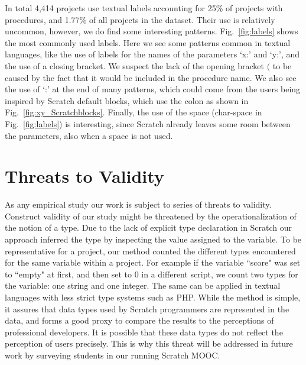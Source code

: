\documentclass[conference]{IEEEtran}
\begin{document}
In total 4,414 projects use textual labels accounting for 25\% of projects with procedures, and 1.77\% of all projects in the dataset. Their use is relatively uncommon, however, we do find some interesting patterns. 
Fig.~\ref{fig:labels} shows the most commonly used labels. Here we see some patterns common in textual languages, like the use of labels for the names of the parameters `x:' and `y:', and the use of a closing bracket. We suspect the lack of the opening bracket $($ to be caused by the fact that it would be included in the procedure name.
We also see the use of `:' at the end of many patterns, which could come from the users being inspired by Scratch default blocks, which use the colon as shown in Fig.~\ref{fig:xy_Scratchblocks}. 
Finally, the use of the space (char-space in Fig.~\ref{fig:labels}) is interesting, since Scratch already leaves some room between the parameters, also when a space is not used. 

\section{Threats to Validity}
As any empirical study our work is subject to series of threats to validity.
Construct validity of our study might be threatened by the operationalization of the notion of a type. 
Due to the lack of explicit type declaration in Scratch our approach inferred the type by inspecting the value assigned to the variable. To be representative for a project, our method counted the different types encountered for the same variable within a project. For example if the variable ``score" was set to ``empty" at first, and then set to 0 in a different script, we count two types for the variable: one string and one integer. The same can be applied in textual languages with less strict type systems such as PHP. While the method is simple, it assures that data types used by Scratch programmers are represented in the data, and forms a good proxy to compare the results to the perceptions of professional developers. It is possible that these data types do not reflect the perception of users precisely. This is why this threat will be addressed in future work by surveying students in our running Scratch MOOC.
\end{document}
